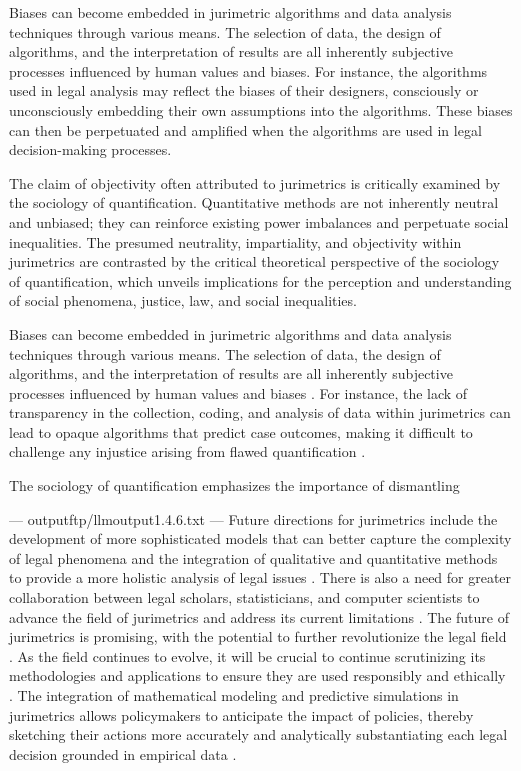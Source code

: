 Biases can become embedded in jurimetric algorithms and data analysis techniques through various means. The selection of data, the design of algorithms, and the interpretation of results are all inherently subjective processes influenced by human values and biases. For instance, the algorithms used in legal analysis may reflect the biases of their designers, consciously or unconsciously embedding their own assumptions into the algorithms. These biases can then be perpetuated and amplified when the algorithms are used in legal decision-making processes.

The claim of objectivity often attributed to jurimetrics is critically examined by the sociology of quantification. Quantitative methods are not inherently neutral and unbiased; they can reinforce existing power imbalances and perpetuate social inequalities. The presumed neutrality, impartiality, and objectivity within jurimetrics are contrasted by the critical theoretical perspective of the sociology of quantification, which unveils implications for the perception and understanding of social phenomena, justice, law, and social inequalities.

Biases can become embedded in jurimetric algorithms and data analysis techniques through various means. The selection of data, the design of algorithms, and the interpretation of results are all inherently subjective processes influenced by human values and biases \cite{10.1007/s11186-021-09453-1,de2010jurimetrics}. For instance, the lack of transparency in the collection, coding, and analysis of data within jurimetrics can lead to opaque algorithms that predict case outcomes, making it difficult to challenge any injustice arising from flawed quantification \cite{10.5040/9781350220645,10.1590/dados.2022.65.3.267}.

The sociology of quantification emphasizes the importance of dismantling


---
outputftp/llmoutput1.4.6.txt
---
Future directions for jurimetrics include the development of more sophisticated models that can better capture the complexity of legal phenomena and the integration of qualitative and quantitative methods to provide a more holistic analysis of legal issues \cite{ribeiro2021quantification}. There is also a need for greater collaboration between legal scholars, statisticians, and computer scientists to advance the field of jurimetrics and address its current limitations \cite{103390fi9040068}. The future of jurimetrics is promising, with the potential to further revolutionize the legal field \cite{10.1057/s41599-020-00557-0,10.5040/9781350220645}. As the field continues to evolve, it will be crucial to continue scrutinizing its methodologies and applications to ensure they are used responsibly and ethically \cite{10.1057/s41599-020-00557-0,10.5040/9781350220645}. The integration of mathematical modeling and predictive simulations in jurimetrics allows policymakers to anticipate the impact of policies, thereby sketching their actions more accurately and analytically substantiating each legal decision grounded in empirical data \cite{10.1057/s41599-020-00557-0,10.5040/9781350220645}.

